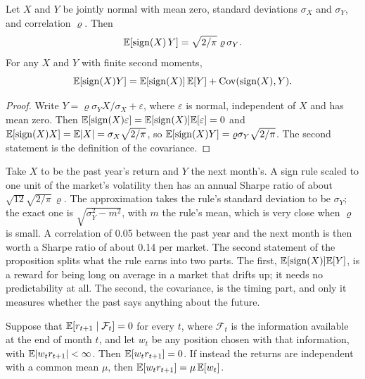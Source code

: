 \begin{chapterrefs}
\begin{proposition}\label{prop9:sign}
Let $X$ and $Y$ be jointly normal with mean zero, standard deviations $\sigma_X$ and $\sigma_Y$, and
correlation $\varrho$. Then
\begin{equation}\label{eq9:sign}
  \mathbb{E}[\operatorname{sign}(X)\,Y] = \sqrt{2/\pi}\;\varrho\,\sigma_Y .
\end{equation}
For any $X$ and $Y$ with finite second moments,
\[
  \mathbb{E}[\operatorname{sign}(X)Y]=\mathbb{E}[\operatorname{sign}(X)]\,\mathbb{E}[Y]+\operatorname{Cov}(\operatorname{sign}(X),Y).
\]
\end{proposition}

\begin{proof}
Write $Y=\varrho\sigma_Y X/\sigma_X+\varepsilon$, where $\varepsilon$ is normal, independent of $X$ and has
mean zero. Then $\mathbb{E}[\operatorname{sign}(X)\varepsilon]=\mathbb{E}[\operatorname{sign}(X)]\mathbb{E}[\varepsilon]=0$ and
$\mathbb{E}[\operatorname{sign}(X)X]=\mathbb{E}|X|=\sigma_X\sqrt{2/\pi}$, so
$\mathbb{E}[\operatorname{sign}(X)Y]=\varrho\sigma_Y\sqrt{2/\pi}$. The second statement is the definition of the
covariance.
\end{proof}

Take $X$ to be the past year's return and $Y$ the next month's. A sign rule scaled to one unit of the
market's volatility then has an annual Sharpe ratio of about $\sqrt{12}\sqrt{2/\pi}\,\varrho$. The
approximation takes the rule's standard deviation to be $\sigma_Y$; the exact one is
$\sqrt{\sigma_Y^2-m^2}$, with $m$ the rule's mean, which is very close when $\varrho$ is small. A correlation of
0.05 between the past year and the next month is then worth a Sharpe ratio of about 0.14 per market. The
second statement of the proposition splits what the rule earns into two parts. The first,
$\mathbb{E}[\operatorname{sign}(X)]\mathbb{E}[Y]$, is a reward for being long on average in a market that drifts up; it
needs no predictability at all. The second, the covariance, is the timing part, and only it measures
whether the past says anything about the future.

\begin{proposition}\label{prop9:mart}
Suppose that $\mathbb{E}[r_{t+1}\mid\mathcal F_t]=0$ for every $t$, where $\mathcal F_t$ is the information
available at the end of month $t$, and let $w_t$ be any position chosen with that information, with
$\mathbb{E}|w_tr_{t+1}|<\infty$. Then $\mathbb{E}[w_tr_{t+1}]=0$. If instead the returns are independent with a common
mean $\mu$, then $\mathbb{E}[w_tr_{t+1}]=\mu\,\mathbb{E}[w_t]$.
\end{proposition}


\end{chapterrefs}

